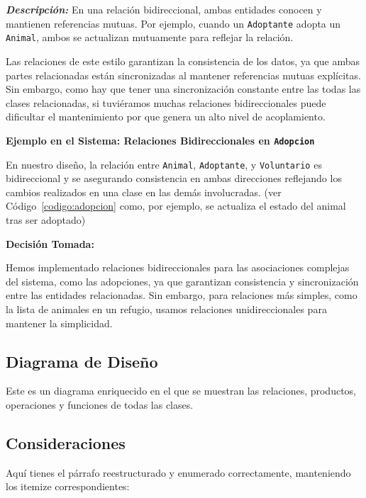 \textit{\textbf{Descripción:}}  
En una relación bidireccional, ambas entidades conocen y mantienen referencias mutuas. 
Por ejemplo, cuando un \texttt{Adoptante} adopta un \texttt{Animal}, ambos se actualizan 
mutuamente para reflejar la relación.\par
\vspace{0.15cm}
Las relaciones de este estilo garantizan la consistencia de los datos, ya que ambas partes relacionadas están 
sincronizadas al mantener referencias mutuas explícitas. Sin embargo, como hay que tener una sincronización constante 
entre las todas las clases relacionadas, si tuviéramos muchas relaciones bidireccionales puede dificultar el mantenimiento
por que genera un alto nivel de acoplamiento.\par
\vspace{0.15cm}
\textbf{Ejemplo en el Sistema: Relaciones Bidireccionales en \texttt{Adopcion}}\par 
En nuestro diseño, la relación entre \texttt{Animal}, \texttt{Adoptante}, y 
\texttt{Voluntario} es bidireccional y se asegurando consistencia en ambas direcciones
reflejando los cambios realizados en una clase en las demás involucradas.
(ver Código~\ref{codigo:adopcion} como, por ejemplo, se actualiza el estado del animal tras ser adoptado)\par
\vspace{0.15cm}
\textbf{Decisión Tomada:}\par
Hemos implementado relaciones bidireccionales para las asociaciones complejas del sistema, 
como las adopciones, ya que garantizan consistencia y sincronización entre las entidades 
relacionadas. Sin embargo, para relaciones más simples, como la lista de animales en un 
refugio, usamos relaciones unidireccionales para mantener la simplicidad.


\newpage
\subsection{Diagrama de Diseño}


Este es un diagrama enriquecido en el que se muestran las relaciones, productos, operaciones y funciones de todas las clases.

\subsection{Consideraciones}\label{page:Consideraciones}

Aquí tienes el párrafo reestructurado y enumerado correctamente, manteniendo los itemize correspondientes:

